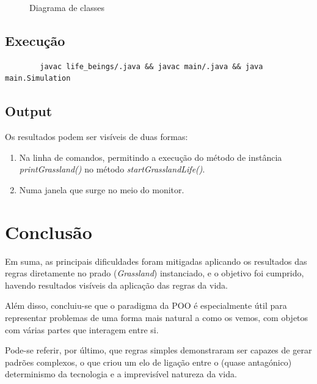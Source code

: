 \documentclass {report}
\begin{document}
\begin{figure}[h]
		\caption{Diagrama de classes}
	\end{figure}
\clearpage

\subsection{Execução}	
	\begin{verbatim}
		javac life_beings/.java && javac main/.java && java main.Simulation
	\end{verbatim}

\subsection{Output}
	Os resultados podem ser visíveis de duas formas:
	\begin{enumerate}
		\item Na linha de comandos, permitindo a execução do método de instância 
		   		\textit{printGrassland()} no método \textit{startGrasslandLife()}.
		\item Numa janela que surge no meio do monitor.
	\end{enumerate}

\section{Conclusão}
	Em suma, as principais dificuldades foram mitigadas aplicando os resultados 
	das regras diretamente no prado (\textit{Grassland}) instanciado, 
	e o objetivo foi cumprido, havendo resultados visíveis da aplicação das regras 
	da vida. 

	Além disso, concluiu-se que o paradigma da POO é especialmente útil 
	para representar problemas de uma forma mais natural a como os vemos,
	com objetos com várias partes que interagem entre si.

	Pode-se referir, por último, que regras simples demonstraram ser capazes 
	de gerar padrões complexos, o que criou um elo de ligação entre o 
	(quase antagónico) determinismo da tecnologia e a imprevisível natureza da vida.
\end{document}
